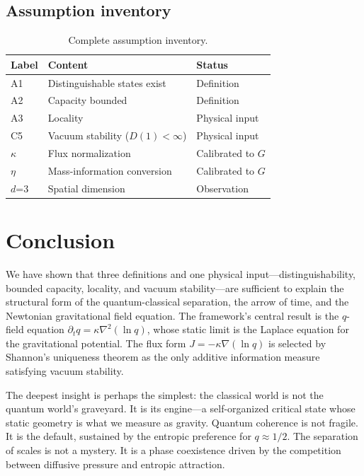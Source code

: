 \documentclass[reprint]{revtex4-2}
\begin{document}
\subsection{Assumption inventory}

\begin{table}[h]
\caption{Complete assumption inventory.}
\begin{tabular}{lll}
\toprule
Label & Content & Status \\
\midrule
A1 & Distinguishable states exist & Definition \\
A2 & Capacity bounded & Definition \\
A3 & Locality & Physical input \\
C5 & Vacuum stability ($D(1)<\infty$) & Physical input \\
$\kappa$ & Flux normalization & Calibrated to $G$ \\
$\eta$ & Mass-information conversion & Calibrated to $G$ \\
$d$=3 & Spatial dimension & Observation \\
\bottomrule
\end{tabular}
\end{table}

\section{Conclusion}

We have shown that three definitions and one physical input---distinguishability, bounded capacity, locality, and vacuum stability---are sufficient to explain the structural form of the quantum-classical separation, the arrow of time, and the Newtonian gravitational field equation. The framework's central result is the $q$-field equation $\partial_t q = \kappa\nabla^2(\ln q)$, whose static limit is the Laplace equation for the gravitational potential. The flux form $J=-\kappa\nabla(\ln q)$ is selected by Shannon's uniqueness theorem as the only additive information measure satisfying vacuum stability.

The deepest insight is perhaps the simplest: the classical world is not the quantum world's graveyard. It is its engine---a self-organized critical state whose static geometry is what we measure as gravity. Quantum coherence is not fragile. It is the default, sustained by the entropic preference for $q\approx 1/2$. The separation of scales is not a mystery. It is a phase coexistence driven by the competition between diffusive pressure and entropic attraction.
\end{document}
